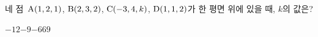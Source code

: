 네 점~$\mathrm{A}(1{,}\mkern3mu\mathopen{}2{,}\mkern3mu\mathopen{}1)$, $\mathrm{B}(2{,}\mkern3mu\mathopen{}3{,}\mkern3mu\mathopen{}2)$, $\mathrm{C}(-3{,}\mkern3mu\mathopen{}4{,}\mkern3mu\mathopen{}k)$, $\mathrm{D}(1{,}\mkern3mu\mathopen{}1{,}\mkern3mu\mathopen{}2)$가 한 평면 위에 있을 때, $k$의 값은?
\begin{choices32}{$-12$}{$-9$}{$-6$}{$6$}{$9$}\end{choices32}
